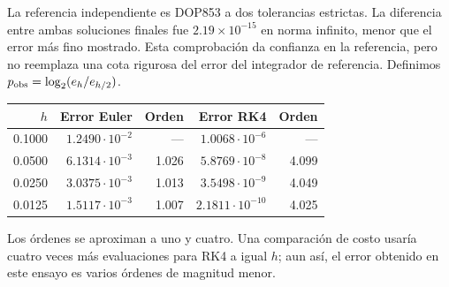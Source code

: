 \documentclass[11pt,a4paper]{article}
\theoremstyle{definition}\newtheorem{definition}[theorem]{Definición}
\theoremstyle{remark}\newtheorem{remark}[theorem]{Observación}
\begin{document}
La referencia independiente es DOP853 a dos tolerancias estrictas. La
diferencia entre ambas soluciones finales fue $2.19\times10^{-15}$ en norma
infinito, menor que el error más fino mostrado. Esta comprobación da
confianza en la referencia, pero no reemplaza una cota rigurosa del error
del integrador de referencia. Definimos $p_{\rm obs}=\log_2(e_h/e_{h/2})$.
\begin{center}\small
\begin{tabular}{@{}rrrrr@{}}\toprule
$h$ & Error Euler & Orden & Error RK4 & Orden\\\midrule
0.1000 & $1.2490\cdot10^{-2}$ & --- & $1.0068\cdot10^{-6}$ & ---\\
0.0500 & $6.1314\cdot10^{-3}$ & 1.026 & $5.8769\cdot10^{-8}$ & 4.099\\
0.0250 & $3.0375\cdot10^{-3}$ & 1.013 & $3.5498\cdot10^{-9}$ & 4.049\\
0.0125 & $1.5117\cdot10^{-3}$ & 1.007 & $2.1811\cdot10^{-10}$ & 4.025\\\bottomrule
\end{tabular}\end{center}
\begin{center}
\end{center}
Los órdenes se aproximan a uno y cuatro. Una comparación de costo usaría
cuatro veces más evaluaciones para RK4 a igual $h$; aun así, el error
obtenido en este ensayo es varios órdenes de magnitud menor.

\clearpage
\end{document}
